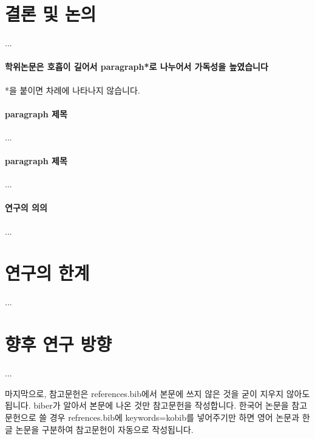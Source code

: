 \section{결론 및 논의}

...

\paragraph*{학위논문은 호흡이 길어서 paragraph*로 나누어서 가독성을 높였습니다}

*을 붙이면 차례에 나타나지 않습니다.

\paragraph*{paragraph 제목}

...

\paragraph*{paragraph 제목}

...

\paragraph*{연구의 의의}

...

\section{연구의 한계}

...

\section{향후 연구 방향}

...

마지막으로, 참고문헌은 references.bib에서 본문에 쓰지 않은 것을 굳이 지우지 않아도 됩니다. biber가 알아서 본문에 나온 것만 참고문헌을 작성합니다. 한국어 논문을 참고문헌으로 쓸 경우 refrences.bib에 keywords={kobib}를 넣어주기만 하면 영어 논문과 한글 논문을 구분하여 참고문헌이 자동으로 작성됩니다.